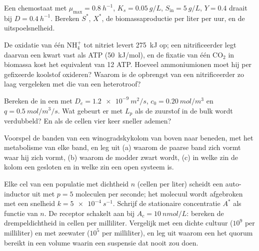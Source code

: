 \begin{exercise}[$\star\star$]\label{exo:b2:microbial-metabolism:7}
Een chemostaat met $\mu_{\max} = \qty{0.8}{h^{-1}}$, $K_s =
\qty{0.05}{g/L}$, $S_{\text{in}} = \qty{5}{g/L}$, $Y = 0.4$ draait bij
$D = \qty{0.4}{h^{-1}}$. Bereken $S^*$, $X^*$, de biomassaproductie per
liter per uur, en de uitspoelsnelheid.
\end{exercise}

\begin{exercise}[$\star\star$]\label{exo:b2:microbial-metabolism:8}
De oxidatie van één $\mathrm{NH_4^+}$ tot nitriet levert \qty{275}{kJ} op;
een nitrificeerder legt daarvan een kwart vast als ATP (\qty{50}{kJ/mol}),
en de fixatie van één $\mathrm{CO_2}$ in biomassa kost het equivalent van
12 ATP. Hoeveel ammoniumionen moet hij per gefixeerde koolstof oxideren?
Waarom is de opbrengst van een nitrificeerder zo laag vergeleken met die
van een heterotroof?
\end{exercise}

\begin{exercise}[$\star\star$]\label{exo:b2:microbial-metabolism:9}
Bereken de  in een  met $D_e =
\qty{1.2e-9}{m^2/s}$, $c_0 = \qty{0.20}{mol/m^3}$ en $q =
\qty{0.5}{mol/m^3/s}$. Wat gebeurt er met $L_p$ als de zuurstof in de
bulk wordt verdubbeld? En als de cellen vier keer sneller ademen?
\end{exercise}

\begin{exercise}[$\star\star\star$]\label{exo:b2:microbial-metabolism:10}
Voorspel de banden van een winogradskykolom van boven naar beneden,
met het metabolisme van elke band, en leg uit (a) waarom de paarse band
zich vormt waar hij zich vormt, (b) waarom de modder zwart wordt, (c) in
welke zin de kolom een gesloten en in welke zin een open systeem is.
\end{exercise}

\begin{exercise}[$\star\star\star$]\label{exo:b2:microbial-metabolism:11}
Elke cel van een populatie met dichtheid $n$ (cellen per liter) scheidt
een auto-inductor uit met $p = 5$ moleculen per seconde; het molecuul
wordt afgebroken met een snelheid $k = \qty{5e-4}{s^{-1}}$. Schrijf de
stationaire concentratie $A^*$ als functie van $n$. De receptor schakelt
aan bij $A_c = \qty{10}{nmol/L}$: bereken de drempeldichtheid in cellen
per milliliter. Vergelijk met een dichte cultuur ($10^{9}$ per
milliliter) en met zeewater ($10^{5}$ per milliliter), en leg uit
waarom een  het quorum bereikt in een volume waarin een suspensie
dat nooit zou doen.
\end{exercise}


